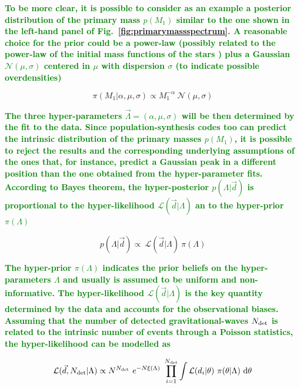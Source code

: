 \documentclass[a4paper,titlepage]{book}     	%
\newcommand{\erika}[1]{\textcolor{green}{\bf#1}}
\begin{document}
\erika{To be more clear, it is possible to consider as an example a posterior distribution of the primary mass $p(M_1)$ similar to the one shown in the left-hand panel of Fig.\ \ref{fig:primarymassspectrum}. A reasonable choice for the prior could be a power-law (possibly related to the power-law of the initial mass functions of the stars \cite{Kroupa2001}) plus a Gaussian $\mathcal{N} (\mu,\sigma)$ centered in $\mu$ with dispersion $\sigma$ (to indicate possible overdensities)} %

\begin{equation}\label{eq:priormassprimary}
    \pi(M_1|\alpha,\mu,\sigma) \propto M_1^{-\alpha}~\mathcal{N} (\mu,\sigma)
\end{equation}

\erika{The three hyper-parameters $\vec{\Lambda} = (\alpha,\mu,\sigma)$ will be then determined by the fit to the data. Since population-synthesis codes too can predict the intrinsic distribution of the primary masses $p(M_1)$, it is possible to reject the results and the corresponding underlying assumptions of the ones that, for instance, predict a Gaussian peak in a different position than the one obtained from the hyper-parameter fits.}\\


\erika{According to Bayes theorem, the hyper-posterior $p(\Lambda|\vec{d})$ is proportional to the hyper-likelihood $\mathcal{L}(\vec{d}|\Lambda)$ an to the hyper-prior $\pi(\Lambda)$}

\begin{equation}\label{eq:hyperposterior}
     p(\Lambda|\vec{d}) \propto~\mathcal{L}(\vec{d}|\Lambda)~\pi(\Lambda)
\end{equation}

\erika{The hyper-prior $\pi(\Lambda)$ indicates the prior beliefs on the hyper-parameters $\Lambda$ and usually is assumed to be uniform and non-informative. The hyper-likelihood $\mathcal{L}(\vec{d}|\Lambda)$ is the key quantity determined by the data and accounts for the observational biases. Assuming that the number of detected gravitational-waves $N_{\rm det}$ is related to the intrinsic number of events through a Poisson statistics, the hyper-likelihood can be modelled as}

\begin{equation}\label{eq:hyperlikelihood}
    \mathcal{L}(\vec{d}, N_{\rm det}| \Lambda) \propto N^{N_{\rm det}}~e^{-N\xi(\Lambda)} ~\prod_{i=1}^{N_{\rm det}} \int \mathcal{L}(d_i|\theta)~\pi(\theta|\Lambda)~\rm d\theta
\end{equation}
\end{document}
